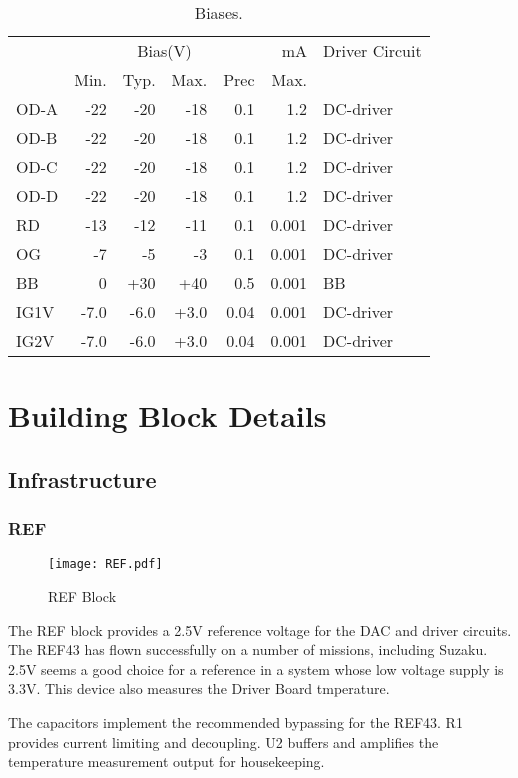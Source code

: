 \begin{table}[h]
\centering
\begin{tabular}{|l|rrrr|r|l|}
\hline
&\multicolumn{4}{c|}{Bias(V)} &mA&Driver Circuit \\
&Min.& Typ.& Max.&Prec& Max.&\\
\hline
OD-A &-22 &-20& -18& 0.1&1.2&DC-driver \\
OD-B &-22 &-20& -18& 0.1&1.2&DC-driver \\
OD-C &-22 &-20& -18& 0.1&1.2&DC-driver \\
OD-D &-22 &-20& -18& 0.1&1.2&DC-driver \\
RD &-13& -12 &-11& 0.1&0.001&DC-driver \\
OG& -7& -5& -3&  0.1&0.001&DC-driver \\
BB &0 &+30 &+40 &0.5&0.001&BB \\
IG1V&-7.0&-6.0&+3.0&0.04&0.001&DC-driver \\
IG2V&-7.0&-6.0&+3.0&0.04&0.001&DC-driver \\
\hline
\end{tabular}
 \caption{Biases.}
 \label{Biases}
\end{table}



\section{Building Block Details}
\subsection{Infrastructure}
\subsubsection{REF}
   \begin{figure}
   \begin{center}
   \texttt{[image: REF.pdf]}
   \end{center}
   \caption{REF Block}
   \end{figure}

The REF block provides a 2.5V reference voltage for the DAC and driver circuits. The REF43 has flown successfully on a number of missions, including Suzaku. 2.5V seems a good choice for a reference in a system whose low voltage supply is 3.3V. This device also measures the Driver Board tmperature. 

The capacitors implement the recommended bypassing for the REF43.
R1 provides current limiting and decoupling. U2 buffers and amplifies the temperature measurement output for housekeeping.



